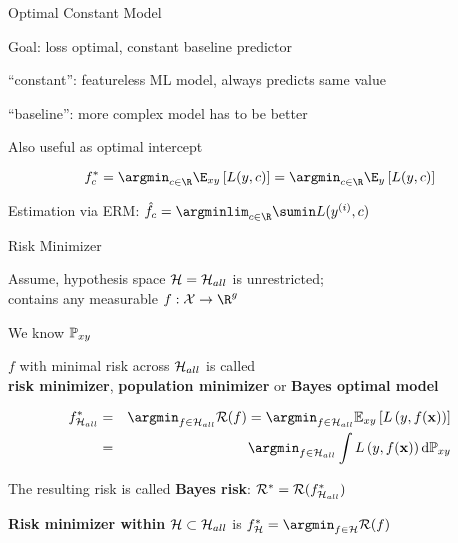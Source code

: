 \documentclass[11pt,compress,t,notes=noshow, xcolor=table]{beamer}
\begin{document}
\begin{framei}[sep=M]{Optimal Constant Model}

\item Goal: loss optimal, constant baseline predictor
\item ``constant'': featureless ML model, always predicts same value
\item ``baseline'': more complex model has to be better 
\item Also useful as optimal intercept


$$f_{c}^{\ast} = \argmin_{c \in \R} \E_{xy} \left[L(y,c)\right] = \argmin_{c \in \R} \E_{y} \left[L(y,c)\right]$$

\item Estimation via ERM: $\hat{f}_c = \argminlim_{c \in \R} \sumin L(\yi,c)$



\end{framei}


\begin{framei}[sep=M]{Risk Minimizer}

\item Assume, hypothesis space $\mathcal{H}=\mathcal{H}_{all}$ is unrestricted;\\
contains any measurable $f: \Xspace \to \R^g$

\item We know $\mathbb{P}_{xy}$

\item $f$ with minimal risk across $\mathcal{H}_{all}$
is called\\
\textbf{risk minimizer}, \textbf{population minimizer} or \textbf{Bayes optimal model}

\begin{eqnarray*}
	\fbayes_{\Hspace_{all}} &=& \argmin_{f \in \Hspace_{all}} \risk(f) = \argmin_{f \in \Hspace_{all}}\Exy\left[\Lxy\right]\\ &=&  \argmin_{f \in \Hspace_{all}}\int \Lxy \text{d}\Pxy
\end{eqnarray*}

\item The resulting risk is called \textbf{Bayes risk}:  $\mathcal{R}^\ast_{} = \mathcal{R}(f^{\ast}_{\mathcal{H}_{all}})$

\item \textbf{Risk minimizer within} $\mathcal{H} \subset \mathcal{H}_{all}$ is
$\fbayes_{\Hspace} = \argmin_{f \in \Hspace} \riskf$

\end{framei}
\end{document}
